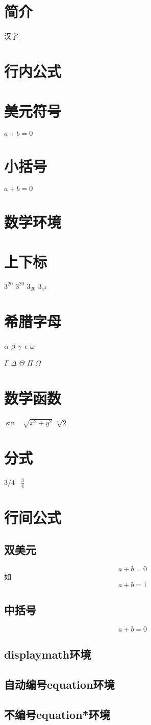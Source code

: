 ﻿\documentclass{ctexart}
\begin{document}
    \section{简介}
    汉字
    \section{行内公式}
    \section{美元符号}
    $a+b=0$
    \section{小括号}
    \(a+b=0\)
    \section{数学环境}
    \section{上下标}
    $3^{20}$
    $3^20$
    $3_{20}$
    $3_{x^2}$
    \section{希腊字母}
    $\alpha$
    $\beta$
    $\gamma$\
    $\epsilon$
    $\omega$

    $\Gamma$
    $\Delta$
    $\Theta$
    $\Pi$
    $\Omega$
    \section{数学函数}
    $\sin$  \  
    $\sqrt{x^2+y^2}$
    $\sqrt[4]{2}$
    \section{分式}
    $3/4$ \ 
    $\frac{3}{4}$
    \section{行间公式}
    \subsection{双美元}
    $$a+b=0$$
    如
    $$a+b=1$$
    \subsection{中括号}
    \[a+b=0\]
    \subsection{displaymath环境}
    \subsection{自动编号equation环境}
    \subsection{不编号equation*环境}
\end{document}
